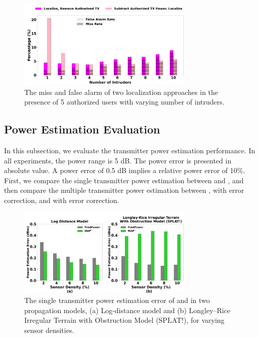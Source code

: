 \begin{figure}[t]
    \centering
    \includegraphics[width=0.75\textwidth]{chapters/wowmom-pmc/figures/splat-missfalse-authorized-varyintru.png}
    \caption{The miss and false alarm of two localization approaches in the presence of 5 authorized users with varying number of intruders.}
    \label{fig:authorized_missfalse}
\end{figure}




\subsection{Power Estimation Evaluation}
\label{subsec:powereval}
In this subsection, we evaluate the transmitter power estimation performance.
In all experiments, the power range is 5 dB.
The power error is presented in absolute value.
A power error of 0.5 dB implies a relative power error of 10\%.
First, we compare the single transmitter power estimation between \map and \power, and then compare the multiple transmitter power estimation between \map, \power with error correction, and \power with error correction.

\begin{figure}
    \centering
    \includegraphics[width=0.75\textwidth]{chapters/wowmom-pmc/figures/powererror_varysensor.png}
    \caption{The single transmitter power estimation error of \power and \map in two propagation models, (a) Log-distance model and (b) Longley--Rice Irregular Terrain with Obstruction Model (SPLAT!), for varying sensor densities.}
    \label{fig:singleTXpower}
\end{figure}


